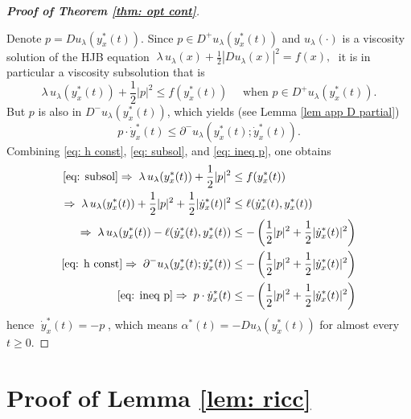 \documentclass[12pt]{amsart}
\numberwithin{equation}{section}
\theoremstyle{plain}
\begin{document}
\begin{proof}[\textbf{Proof of Theorem \ref{thm: opt cont}}]
\begin{itemize}
\end{itemize}
Denote $p = Du_{\lambda}(y^{*}_{x}(t))$. Since $p\in D^{+}u_{\lambda}(y^{*}_{x}(t))$ and $u_{\lambda}(\cdot)$ is a viscosity solution of the HJB equation $\;\lambda\, u_{\lambda}(x) + \frac{1}{2}|Du_{\lambda}(x)|^{2} = f(x),\;$ 
it is in particular a viscosity subsolution that is
\begin{equation}\label{eq: subsol}
    \lambda\, u_{\lambda}(y^{*}_{x}(t)) + \frac{1}{2}|p|^{2} \leq f(y^{*}_{x}(t)) \quad \text{ when } p\in D^{+}u_{\lambda}(y^{*}_{x}(t)).
\end{equation}
But $p$ is also in $D^{-}u_{\lambda}(y^{*}_{x}(t))$, which yields (see Lemma \ref{lem app D partial})
\begin{equation}\label{eq: ineq p}
    p \cdot \dot{y}^{*}_{x}(t) \leq \partial^{-}u_{\lambda}(y^{*}_{x}(t); \dot{y}^{*}_{x}(t)).
\end{equation}
Combining \eqref{eq: h const}, \eqref{eq: subsol}, and \eqref{eq: ineq p}, one obtains
\begin{equation*}
\begin{aligned}
    \eqref{eq: subsol} \Rightarrow\; \lambda\, u_{\lambda}(y^{*}_{x}(t)) + \frac{1}{2}|p|^{2} & \leq f(y^{*}_{x}(t))\\
    \Rightarrow\; \lambda\, u_{\lambda}(y^{*}_{x}(t)) + \frac{1}{2}|p|^{2} + \frac{1}{2}|\dot{y}^{*}_{x}(t)|^{2} &\leq \ell(\dot{y}^{*}_{x}(t),y^{*}_{x}(t))\\
    \Rightarrow\; \lambda\, u_{\lambda}(y^{*}_{x}(t)) - \ell(\dot{y}^{*}_{x}(t),y^{*}_{x}(t)) & \leq -\left(\frac{1}{2}|p|^{2} + \frac{1}{2}|\dot{y}^{*}_{x}(t)|^{2}\right)\\
    \eqref{eq: h const} \Rightarrow\; \partial^{-}u_{\lambda}(y^{*}_{x}(t);\dot{y}^{*}_{x}(t)) & \leq  -\left(\frac{1}{2}|p|^{2} + \frac{1}{2}|\dot{y}^{*}_{x}(t)|^{2}\right)\\
    \eqref{eq: ineq p}\Rightarrow\; p\cdot \dot{y}^{*}_{x}(t) & \leq  -\left(\frac{1}{2}|p|^{2} + \frac{1}{2}|\dot{y}^{*}_{x}(t)|^{2}\right)
\end{aligned}
\end{equation*}
hence $ \;\dot{y}^{*}_{x}(t) = -p \;$, which means $\alpha^{*}(t) = -Du_{\lambda}(y^{*}_{x}(t))$ for almost every $t\geq 0$.
\end{proof}




\section{Proof of Lemma \ref{lem: ricc}}\label{app: ricc}
\end{document}
